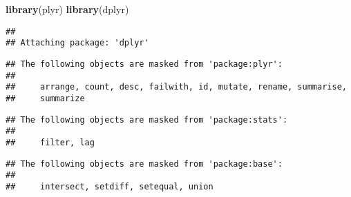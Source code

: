 \documentclass[
]{article}
\newenvironment{Shaded}{\begin{snugshade}}{\end{snugshade}}
\newcommand{\FunctionTok}[1]{\textcolor[rgb]{0.13,0.29,0.53}{\textbf{#1}}}
\newcommand{\NormalTok}[1]{#1}
\begin{document}
\begin{Shaded}
\begin{Highlighting}[]
\FunctionTok{library}\NormalTok{(plyr)}
\FunctionTok{library}\NormalTok{(dplyr)}
\end{Highlighting}
\end{Shaded}

\begin{verbatim}
## 
## Attaching package: 'dplyr'
\end{verbatim}

\begin{verbatim}
## The following objects are masked from 'package:plyr':
## 
##     arrange, count, desc, failwith, id, mutate, rename, summarise,
##     summarize
\end{verbatim}

\begin{verbatim}
## The following objects are masked from 'package:stats':
## 
##     filter, lag
\end{verbatim}

\begin{verbatim}
## The following objects are masked from 'package:base':
## 
##     intersect, setdiff, setequal, union
\end{verbatim}
\end{document}
